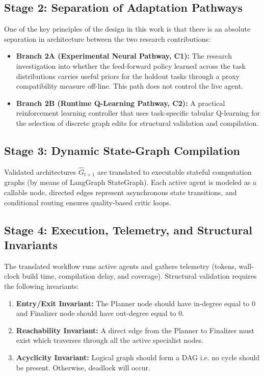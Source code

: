 \documentclass[conference]{IEEEtran}
\begin{document}
\subsection{Stage 2: Separation of Adaptation Pathways}
One of the key principles of the design in this work is that there is an absolute separation in architecture between the two research contributions:
\begin{itemize}[leftmargin=*]
    \item \textbf{Branch 2A (Experimental Neural Pathway, C1):} The research investigation into whether the feed-forward policy learned across the task distributions carries useful priors for the holdout tasks through a proxy compatibility measure off-line. This path does not control the live agent.
    \item \textbf{Branch 2B (Runtime Q-Learning Pathway, C2):} A practical reinforcement learning controller that uses task-specific tabular Q-learning for the selection of discrete graph edits for structural validation and compilation.
\end{itemize}

\subsection{Stage 3: Dynamic State-Graph Compilation}
Validated architectures $\widehat{G}_{t+1}$ are translated to executable stateful computation graphs (by means of LangGraph StateGraph). Each active agent is modeled as a callable node, directed edges represent asynchronous state transitions, and conditional routing ensures quality-based critic loops.

\subsection{Stage 4: Execution, Telemetry, and Structural Invariants}
The translated workflow runs active agents and gathers telemetry (tokens, wall-clock build time, compilation delay, and coverage). Structural validation requires the following invariants:
\begin{enumerate}[leftmargin=*]
    \item \textbf{Entry/Exit Invariant:} The Planner node should have in-degree equal to 0 and Finalizer node should have out-degree equal to 0.
    \item \textbf{Reachability Invariant:} A direct edge from the Planner to Finalizer must exist which traverses through all the active specialist nodes.
    \item \textbf{Acyclicity Invariant:} Logical graph should form a DAG i.e. no cycle should be present. Otherwise, deadlock will occur.
\end{enumerate}
\end{document}
